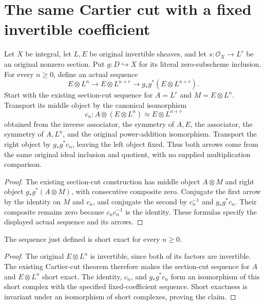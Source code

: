 \section{The same Cartier cut with a fixed invertible coefficient}

\begin{definition}
\label{def:seshadri-fixed-coefficient-power-cut-sequence}
\leanok
{}
Let $X$ be integral, let $L,E$ be original invertible sheaves, and let
$s:\mathcal O_X\to L^r$ be an original nonzero section. Put
$g:D\hookrightarrow X$ for its literal zero-subscheme inclusion.
For every $n\geq0$, define an actual sequence
\[
 E\otimes L^n\longrightarrow E\otimes L^{n+r}
 \longrightarrow g_*g^*(E\otimes L^{n+r}).
\]
Start with the existing section-cut sequence for $A=L^r$ and
$M=E\otimes L^n$. Transport its middle object by the canonical
isomorphism
\[
 c_n:A\otimes(E\otimes L^n)\simeq E\otimes L^{n+r}
\]
obtained from the inverse associator, the symmetry of $A,E$, the
associator, the symmetry of $A,L^n$, and the original power-addition
isomorphism. Transport the right object by $g_*g^*c_n$, leaving the
left object fixed. Thus both arrows come from the same original ideal
inclusion and quotient, with no supplied multiplication comparison.
\end{definition}
\begin{proof}
The existing section-cut construction has middle object
$A\otimes M$ and right object $g_*g^*(A\otimes M)$, with consecutive
composite zero. Conjugate the first arrow by the identity on $M$ and
$c_n$, and conjugate the second by $c_n^{-1}$ and $g_*g^*c_n$.
Their composite remains zero because $c_nc_n^{-1}$ is the identity.
These formulas specify the displayed actual sequence and its arrows.
\end{proof}

\begin{lemma}
\label{lem:seshadri-fixed-coefficient-power-cut-short-exact}
\leanok
{}
The sequence just defined is short exact for every $n\geq0$.
\end{lemma}
\begin{proof}
The original $E\otimes L^n$ is invertible, since both of its factors
are invertible. The existing Cartier-cut theorem therefore makes the
section-cut sequence for $A$ and $E\otimes L^n$ short exact.
The identity, $c_n$, and $g_*g^*c_n$ form an isomorphism of this short
complex with the specified fixed-coefficient sequence. Short exactness
is invariant under an isomorphism of short complexes, proving the claim.
\end{proof}

